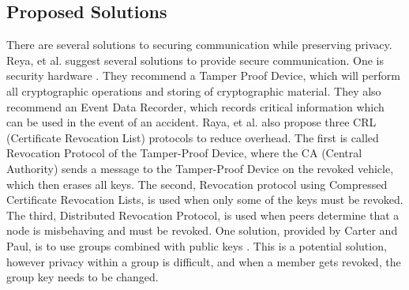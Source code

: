 \documentclass {article}
\begin{document}
\subsection{Proposed Solutions}
There are several solutions to securing communication while preserving privacy. Reya, et al. suggest several solutions to provide secure communication. One is security hardware \autocite{SecVeComs}. They recommend a Tamper Proof Device, which will perform all cryptographic operations and storing of cryptographic material. They also recommend an Event Data Recorder, which records critical information which can be used in the event of an accident. Raya, et al. also propose three CRL (Certificate Revocation List) protocols to reduce overhead. The first is called Revocation Protocol of the Tamper-Proof Device, where the CA (Central Authority) sends a message to the Tamper-Proof Device on the revoked vehicle, which then erases all keys. The second, Revocation protocol using Compressed Certificate Revocation Lists, is used when only some of the keys must be revoked. The third, Distributed Revocation Protocol, is used when peers determine that a node is misbehaving and must be revoked. One solution, provided by Carter and Paul, is to use groups combined with public keys \autocite{V_BasedSecOps}. This is a potential solution, however privacy within a group is difficult, and when a member gets revoked, the group key needs to be changed. 
\end{document}
